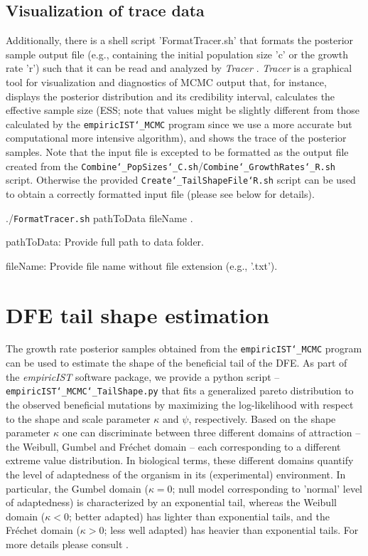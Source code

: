 \documentclass[12pt,a4paper]{scrartcl}
\begin{document}
\subsection{Visualization of trace data}

Additionally, there is a shell script 'FormatTracer.sh' that formats the posterior sample output file (e.g., containing the initial population size 'c' or the growth rate 'r') such that it can be read and analyzed by \textit{Tracer} \citep{RamSX14}. \textit{Tracer} is a graphical tool for visualization and diagnostics of MCMC output that, for instance, displays the posterior distribution and its credibility interval, calculates the effective sample size (ESS; note that values might be slightly different from those calculated by the \texttt{empiricIST\char`_MCMC} program since we use a more accurate but computational more intensive algorithm), and shows the trace of the posterior samples. Note that the input file is excepted to be formatted as the output file created from the \texttt{Combine\char`_PopSizes\char`_C.sh}/\texttt{Combine\char`_GrowthRates\char`_R.sh} script. Otherwise the provided \texttt{Create\char`_TailShapeFile\char`R.sh} script can be used to obtain a correctly formatted input file (please see below for details).

\vspace{0.05cm}
./\texttt{FormatTracer.sh} pathToData fileName .
\vspace{0.05cm}

pathToData: Provide full path to data folder.
\vspace{0.05cm}

fileName: Provide file name without file extension (e.g., '.txt').
\vspace{0.05cm}



\section{DFE tail shape estimation}

The growth rate posterior samples obtained from the \texttt{empiricIST\char`_MCMC} program can be used to estimate the shape of the beneficial tail of the DFE.
As part of the \emph{empiricIST} software package, we provide a python script -- \texttt{empiricIST\char`_MCMC\char`_TailShape.py} that fits a generalized pareto distribution to the observed beneficial mutations by maximizing the log-likelihood with respect to the shape and scale parameter $\kappa$ and $\psi$, respectively. Based on the shape parameter $\kappa$ one can discriminate between three different domains of attraction -- the Weibull, Gumbel and Fr\'{e}chet domain -- each corresponding to a different extreme value distribution. In biological terms, these different domains quantify the level of adaptedness of the organism in its (experimental) environment. In particular, the Gumbel domain ($\kappa=0$; null model corresponding to 'normal' level of adaptedness) is characterized by an exponential tail, whereas the Weibull domain ($\kappa<0$; better adapted) has lighter than exponential tails, and the Fr\'{e}chet domain ($\kappa>0$; less well adapted) has heavier than exponential tails. For more details please consult \cite{BeiRW07}.
\end{document}
